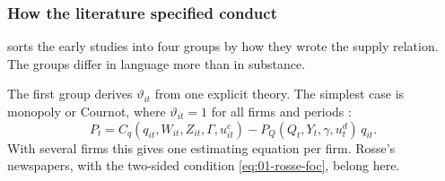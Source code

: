 \subsubsection{How the literature specified conduct}\label{sec:01-conduct-taxonomy}

\citet[Section~2.2]{Bresnahan1989} sorts the early studies into four groups by how they wrote the supply relation. The
groups differ in language more than in substance.

The first group derives $\vartheta_{it}$ from one explicit theory. The simplest case is monopoly or Cournot, where
$\vartheta_{it} = 1$ for all firms and periods \citep[eq.~6]{Bresnahan1989}:
\begin{equation*}
P_t = C_q(q_{it}, W_{it}, Z_{it}, \Gamma, u^c_{it}) - P_Q(Q_t, Y_t, \gamma, u^d_t)\,q_{it}.
\end{equation*}
With several firms this gives one estimating equation per firm. Rosse's newspapers, with the two-sided condition
\eqref{eq:01-rosse-foc}, belong here.

